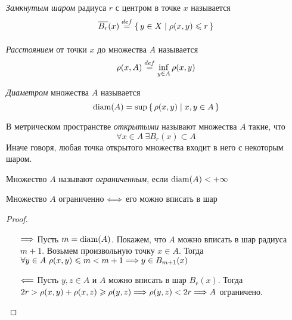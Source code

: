 \begin{definition}
    \textit{Замкнутым шаром} радиуса $r$ с центром в точке $x$ называется
\[
    \overline{B_r}(x) \overset{def}{\underset{}{=}} \{\, y \in X \mid \rho(x, y) \leqslant r \,\}
\]
\end{definition}

\begin{definition}
    \textit{Расстоянием} от точки $x$ до множества $A$ называется
\[
    \rho(x, A) \overset{def}{\underset{}{=}} \inf_{y \in A}{\rho(x, y)}
\]
\end{definition}

\begin{definition}
    \textit{Диаметром} множества $A$ называется
\[
    \operatorname{diam}(A) = \sup{\{\, \rho(x, y) \mid x, y \in A \,\}}
\]
\end{definition}

\begin{definition}
    В метрическом пространстве \textit{открытыми} называют множества $A$
    такие, что
\[
    \forall x \in A~ \exists B_r(x) \subset A
\]
Иначе говоря, любая точка открытого множества входит в него с некоторым шаром.
\end{definition}

\begin{definition}
    Множество $A$ называют \textit{ограниченным}, если $\operatorname{diam}(A) < +\infty$
\end{definition}

\begin{theorem}
    Множество $A$ ограниченно $\Longleftrightarrow$ его можно вписать в шар
\end{theorem}
\begin{proof}
    \enewline
    \begin{itemize}
        \item[$\Longrightarrow$] Пусть $m = \operatorname{diam}(A)$. Покажем, что $A$ можно вписать в
        шар радиуса $m + 1$. Возьмем произвольную точку $x \in A$. Тогда
        $\forall y \in A~\rho(x, y) \leqslant m < m + 1 \Longrightarrow y \in B_{m+1}(x)$
        \item[$\Longleftarrow$] Пусть $y, z \in A$ и $A$ можно вписать в шар $B_r(x)$.
        Тогда $2r > \rho(x, y) + \rho(x, z) \geqslant \rho(y, z) \Longrightarrow \rho(y, z)
        < 2r \Longrightarrow A$ ограничено.
    \end{itemize}
\end{proof}

